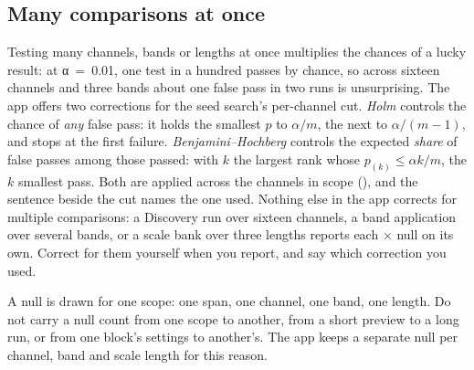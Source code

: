 \subsection{Many comparisons at once}
Testing many channels, bands or lengths at once multiplies the chances of a lucky result:
at α~=~0.01, one test in a hundred passes by chance, so across sixteen channels and three bands
about one false pass in two runs is unsurprising. The app offers two corrections for the seed
search's per-channel cut. \emph{Holm} \citep{holm1979simple} controls the chance of
\emph{any} false pass: it holds the smallest $p$ to $\alpha/m$, the next to $\alpha/(m-1)$, and
stops at the first failure. \emph{Benjamini--Hochberg} \citep{benjamini1995controlling}
controls the expected \emph{share} of false passes among those passed: with $k$ the largest
rank whose $p_{(k)} \leq \alpha k/m$, the $k$ smallest pass. Both are applied across the
channels in scope (), and the sentence beside the cut names the one
used. Nothing else in the app corrects for multiple comparisons: a Discovery run over sixteen
channels, a band application over several bands, or a scale bank over three lengths reports
each × null on its own. Correct for them yourself when you report, and say which correction
you used.

\begin{watchout}
A null is drawn for one scope: one span, one channel, one band, one length. Do not carry a
null count from one scope to another, from a short preview to a long run, or from one block's
settings to another's. The app keeps a separate null per channel, band and scale length for
this reason.
\end{watchout}
